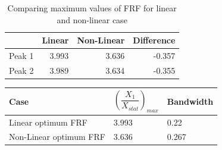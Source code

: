 \begin{table}[h!]
\centering
\begin{tabular}{|r|r|r|r|}
\hline
 & Linear & Non-Linear & Difference \\ \hline
Peak 1& 3.993 & 3.636 & -0.357\\
Peak 2 & 3.989  & 3.634 & -0.355\\ \hline
\end{tabular}
\caption{Comparing maximum values of FRF for linear and non-linear case}
\end{table}

\begin{table}
\begin{tabular}{|m{6cm}|m{2cm}|m{2cm}|}
\hline
Case& $\left(\dfrac{X_{1}}{X_{stat}}\right)_{max}$ & Bandwidth \\
\hline
Linear optimum FRF & 3.993 & 0.22 

\\
\hline
Non-Linear optimum FRF & 3.636 & 0.267

 \\ 
\hline
\end{tabular}
\end{table}

